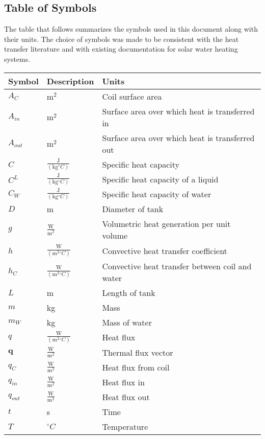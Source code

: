 \documentclass[12pt]{article}
\begin{document}
\subsection{Table of Symbols}
\label{Sec:ToS}
The table that follows summarizes the symbols used in this document along with their units. The choice of symbols was made to be consistent with the heat transfer literature and with existing documentation for solar water heating systems.
\begin{longtable*}{l l l}
\toprule
Symbol & Description & Units
\\
\midrule
$A_{C}$ & $\text{m}^{2}$ & Coil surface area
\\
$A_{in}$ & $\text{m}^{2}$ & Surface area over which heat is transferred in
\\
$A_{out}$ & $\text{m}^{2}$ & Surface area over which heat is transferred out
\\
$C$ & $\frac{\text{J}}{(\text{kg}{}^{\circ}C)}$ & Specific heat capacity
\\
$C^{L}$ & $\frac{\text{J}}{(\text{kg}{}^{\circ}C)}$ & Specific heat capacity of a liquid
\\
$C_{W}$ & $\frac{\text{J}}{(\text{kg}{}^{\circ}C)}$ & Specific heat capacity of water
\\
$D$ & m & Diameter of tank
\\
$g$ & $\frac{\text{W}}{\text{m}^{2}}$ & Volumetric heat generation per unit volume
\\
$h$ & $\frac{\text{W}}{(\text{m}^{2}{}^{\circ}C)}$ & Convective heat transfer coefficient
\\
$h_{C}$ & $\frac{\text{W}}{(\text{m}^{2}{}^{\circ}C)}$ & Convective heat transfer between coil and water
\\
$L$ & m & Length of tank
\\
$m$ & kg & Mass
\\
$m_{W}$ & kg & Mass of water
\\
$q$ & $\frac{\text{W}}{(\text{m}^{2}{}^{\circ}C)}$ & Heat flux
\\
$\mathbf{q}$ & $\frac{\text{W}}{\text{m}^{2}}$ & Thermal flux vector
\\
$q_{C}$ & $\frac{\text{W}}{\text{m}^{2}}$ & Heat flux from coil
\\
$q_{in}$ & $\frac{\text{W}}{\text{m}^{2}}$ & Heat flux in
\\
$q_{out}$ & $\frac{\text{W}}{\text{m}^{2}}$ & Heat flux out
\\
$t$ & s & Time
\\
$T$ & ${}^{\circ}C$ & Temperature

\end{longtable*}
\end{document}
